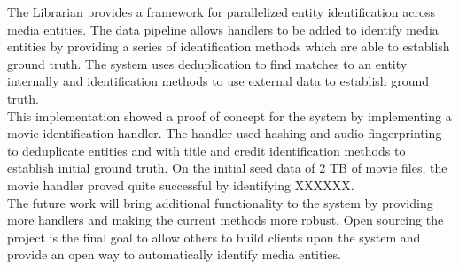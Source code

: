 \documentclass[paper=a4, fontsize=11pt]{scrartcl} %
\numberwithin{equation}{section} %
\numberwithin{figure}{section} %
\numberwithin{table}{section} %
\begin{document}
The Librarian provides a framework for parallelized entity identification across media entities. The data pipeline allows handlers to be added to identify media entities by providing a series of identification methods which are able to establish ground truth. The system uses deduplication to find matches to an entity internally and identification methods to use external data to establish ground truth. \\

This implementation showed a proof of concept for the system by implementing a movie identification handler. The handler used hashing and audio fingerprinting to deduplicate entities and with title and credit identification methods to establish initial ground truth. On the initial seed data of 2 TB of movie files, the movie handler proved quite successful by identifying XXXXXX. \\

The future work will bring additional functionality to the system by providing more handlers and making the current methods more robust. Open sourcing the project is the final goal to allow others to build clients upon the system and provide an open way to automatically identify media entities. \\

\end{document}
